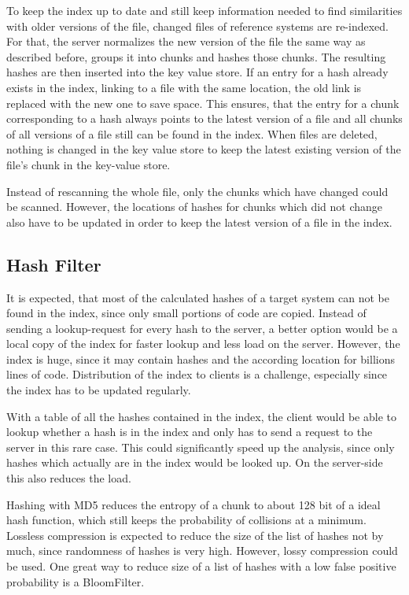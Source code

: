 To keep the index up to date and still keep information needed to find similarities with older versions of the file, changed files of reference systems are re-indexed.
For that, the server normalizes the new version of the file the same way as described before, groups it into chunks and hashes those chunks.
The resulting hashes are then inserted into the key value store.
If an entry for a hash already exists in the index, linking to a file with the same location, the old link is replaced with the new one to save space.
This ensures, that the entry for a chunk corresponding to a hash always points to the latest version of a file and all chunks of all versions of a file still can be found in the index.
When files are deleted, nothing is changed in the key value store to keep the latest existing version of the file's chunk in the key-value store.

Instead of rescanning the whole file, only the chunks which have changed could be scanned.
However, the locations of hashes for chunks which did not change also have to be updated  in order to keep the latest version of a file in the index.

\subsection{Hash Filter}\label{section:approach/creating_index/hash_filter}
It is expected, that most of the calculated hashes of a target system can not be found in the index, since only small portions of code are copied.
Instead of sending a lookup-request for every hash to the server, a better option would be a local copy of the index for faster lookup and less load on the server.
However, the index is huge, since it may contain hashes and the according location for billions lines of code.
Distribution of the index to clients is a challenge, especially since the index has to be updated regularly.

With a table of all the hashes contained in the index, the client would be able to lookup whether a hash is in the index and only has to send a request to the server in this rare case.
This could significantly speed up the analysis, since only hashes which actually are in the index would be looked up.
On the server-side this also reduces the load.

Hashing with MD5 reduces the entropy of a chunk to about 128 bit of a ideal hash function, which still keeps the probability of collisions at a minimum.
Lossless compression is expected to reduce the size of the list of hashes not by much, since randomness of hashes is very high.
However, lossy compression could be used.
One great way to reduce size of a list of hashes with a low false positive probability is a BloomFilter.

